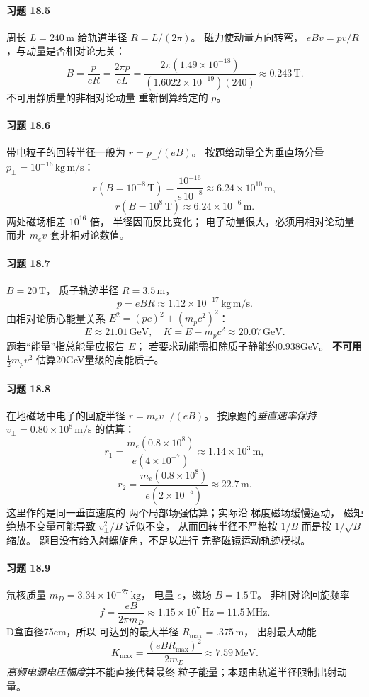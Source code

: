 \paragraph{习题 18.5}
周长 \(L=240\,\mathrm m\)
给轨道半径 \(R=L/(2\pi)\)。
磁力使动量方向转弯，
\(eBv=pv/R\)，与动量是否相对论无关：
\[
 \boxed{B=\frac{p}{eR}
 =\frac{2\pi p}{eL}
 =\frac{2\pi(1.49\times10^{-18})}
 {(1.6022\times10^{-19})(240)}
 \approx0.243\,\mathrm T}.
\]
不可用静质量的非相对论动量
重新倒算给定的 \(p\)。

\paragraph{习题 18.6}
带电粒子的回转半径一般为
\(r=p_\perp/(eB)\)。
按题给动量全为垂直场分量
\(p_\perp=10^{-16}\,\mathrm{kg\,m/s}\)：
\[
 \boxed{r(B=10^{-8}\,\mathrm T)
 =\frac{10^{-16}}{e\,10^{-8}}
 \approx6.24\times10^{10}\,\mathrm m},
\]
\[
 \boxed{r(B=10^8\,\mathrm T)
 \approx6.24\times10^{-6}\,\mathrm m}.
\]
两处磁场相差 \(10^{16}\) 倍，
半径因而反比变化；
电子动量很大，必须用相对论动量而非
\(m_ev\) 套非相对论数值。

\paragraph{习题 18.7}
\(B=20\,\mathrm T\)，
质子轨迹半径 \(R=3.5\,\mathrm m\)，
\[
 \boxed{p=eBR
 \approx1.12\times10^{-17}\,\mathrm{kg\,m/s}}.
\]
由相对论质心能量关系
\(E^2=(pc)^2+(m_pc^2)^2\)：
\[
 \boxed{E\approx21.01\,\mathrm{GeV}},
\quad
 \boxed{K=E-m_pc^2
 \approx20.07\,\mathrm{GeV}}.
\]
题若“能量”指总能量应报告 \(E\)；
若要求动能需扣除质子静能约0.938GeV。
\textbf{不可用} \(\tfrac12m_pv^2\)
估算20GeV量级的高能质子。

\paragraph{习题 18.8}
在地磁场中电子的回旋半径
\(r=m_ev_\perp/(eB)\)。
按原题的\emph{垂直速率保持
\(v_\perp=0.80\times10^8\,\mathrm{m/s}\)}
的估算：
\[
 \boxed{r_1=\frac{m_e(0.8\times10^8)}
 {e(4\times10^{-7})}
 \approx1.14\times10^3\,\mathrm m},
\]
\[
 \boxed{r_2=\frac{m_e(0.8\times10^8)}
 {e(2\times10^{-5})}
 \approx22.7\,\mathrm m}.
\]
这里作的是同一垂直速度的
两个局部场强估算；实际沿
梯度磁场缓慢运动，
磁矩绝热不变量可能导致
\(v_\perp^2/B\) 近似不变，
从而回转半径不严格按 \(1/B\)
而是按 \(1/\sqrt B\) 缩放。
题目没有给入射螺旋角，不足以进行
完整磁镜运动轨迹模拟。

\paragraph{习题 18.9}
氘核质量
\(m_D=3.34\times10^{-27}\,\mathrm{kg}\)，
电量 \(e\)，磁场 \(B=1.5\,\mathrm T\)。
非相对论回旋频率
\[
 \boxed{f=\frac{eB}{2\pi m_D}
 \approx1.15\times10^7\,\mathrm{Hz}
 =11.5\,\mathrm{MHz}}.
\]
D盒直径75cm，所以
可达到的最大半径 \(R_{\max}=.375\,\mathrm m\)，
出射最大动能
\[
 \boxed{K_{\max}=
 \frac{(eBR_{\max})^2}{2m_D}
 \approx7.59\,\mathrm{MeV}}.
\]
\emph{高频电源电压幅度}并不能直接代替最终
粒子能量；本题由轨道半径限制出射动量。

